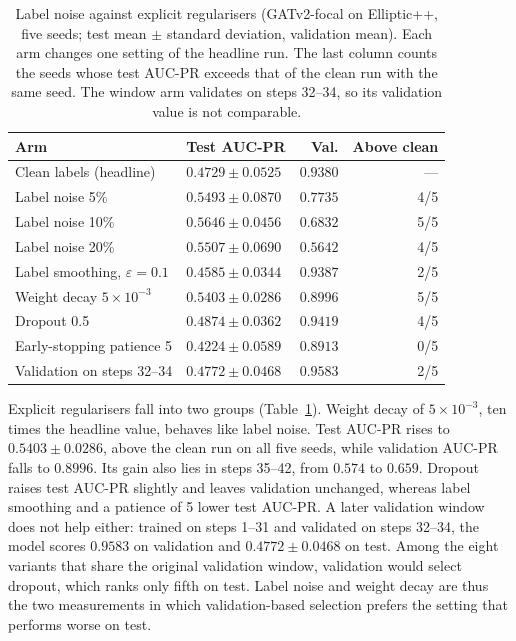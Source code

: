 \documentclass[conference]{IEEEtran}
\begin{document}
\begin{table}[t]
\caption{Label noise against explicit regularisers (GATv2-focal on
Elliptic++, five seeds; test mean $\pm$ standard deviation, validation
mean). Each arm changes one setting of the headline run. The last column
counts the seeds whose test AUC-PR exceeds that of the clean run with the same
seed. The window arm validates on steps 32--34, so its validation value is not
comparable.}
\label{tab:regularisers}
\centering
\footnotesize
\setlength{\tabcolsep}{3pt}
\begin{tabular}{llrr}
\toprule
Arm & Test AUC-PR & Val. & Above clean \\
\midrule
Clean labels (headline) & $0.4729 \pm 0.0525$ & $0.9380$ & --- \\
Label noise 5\% & $0.5493 \pm 0.0870$ & $0.7735$ & 4/5 \\
Label noise 10\% & $0.5646 \pm 0.0456$ & $0.6832$ & 5/5 \\
Label noise 20\% & $0.5507 \pm 0.0690$ & $0.5642$ & 4/5 \\
Label smoothing, $\varepsilon = 0.1$ & $0.4585 \pm 0.0344$ & $0.9387$ & 2/5 \\
Weight decay $5 \times 10^{-3}$ & $0.5403 \pm 0.0286$ & $0.8996$ & 5/5 \\
Dropout 0.5 & $0.4874 \pm 0.0362$ & $0.9419$ & 4/5 \\
Early-stopping patience 5 & $0.4224 \pm 0.0589$ & $0.8913$ & 0/5 \\
Validation on steps 32--34 & $0.4772 \pm 0.0468$ & $0.9583$ & 2/5 \\
\bottomrule
\end{tabular}
\end{table}

Explicit regularisers fall into two groups (Table~\ref{tab:regularisers}).
Weight decay of $5 \times 10^{-3}$, ten times the headline value, behaves like
label noise. Test AUC-PR rises to $0.5403 \pm 0.0286$, above the clean run on
all five seeds, while validation AUC-PR falls to $0.8996$. Its gain also lies
in steps 35--42, from $0.574$ to $0.659$. Dropout raises test AUC-PR slightly
and leaves validation unchanged, whereas label smoothing and a patience of 5
lower test AUC-PR. A later validation window does not help either: trained on
steps 1--31 and validated on steps 32--34, the model scores $0.9583$ on
validation and $0.4772 \pm 0.0468$ on test. Among the eight variants that share
the original validation window, validation would select dropout, which ranks
only fifth on test. Label noise and weight decay are thus the two measurements
in which validation-based selection prefers the setting that performs worse on
test.
\end{document}
